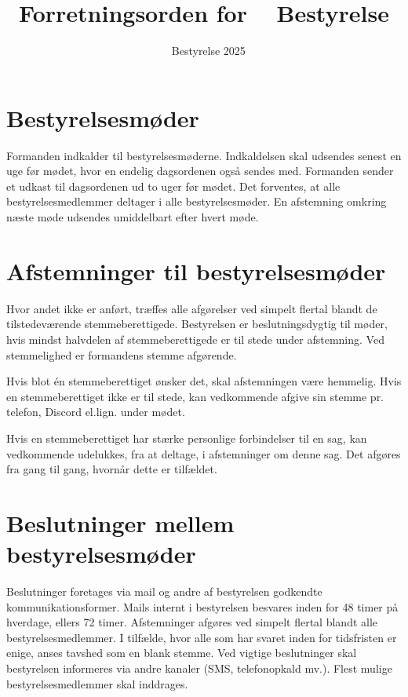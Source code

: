 

\title{Forretningsorden for \fredagscafeen~ Bestyrelse}
\author{\fredagscafeen~ Bestyrelse 2025}
\date{}

\renewcommand{\thesection}{§\arabic{section}}



\maketitle

\section{Bestyrelsesmøder}
Formanden indkalder til bestyrelsesmøderne. Indkaldelsen skal udsendes senest en uge før mødet, 
hvor en endelig dagsordenen også sendes med. Formanden sender et udkast til dagsordenen ud to 
uger før mødet. Det forventes, at alle bestyrelsesmedlemmer deltager i alle bestyrelsesmøder. 
En afstemning omkring næste møde udsendes umiddelbart efter hvert møde.

\section{Afstemninger til bestyrelsesmøder}
Hvor andet ikke er anført, træffes alle afgørelser ved simpelt flertal blandt de tilstedeværende 
stemmeberettigede. Bestyrelsen er beslutningsdygtig til møder, hvis mindst halvdelen af 
stemmeberettigede er til stede under afstemning. Ved stemmelighed er formandens stemme afgørende.

Hvis blot én stemmeberettiget ønsker det, skal afstemningen være hemmelig. Hvis en stemmeberettiget 
ikke er til stede, kan vedkommende afgive sin stemme pr. telefon, Discord el.lign. under mødet.

Hvis en stemmeberettiget har stærke personlige forbindelser til en sag, kan vedkommende udelukkes, 
fra at deltage, i afstemninger om denne sag. Det afgøres fra gang til gang, hvornår dette er tilfældet.

\section{Beslutninger mellem bestyrelsesmøder}
Beslutninger foretages via mail og andre af bestyrelsen godkendte kommunikationsformer. Mails internt 
i bestyrelsen besvares inden for 48 timer på hverdage, ellers 72 timer. Afstemninger afgøres ved simpelt 
flertal blandt alle bestyrelsesmedlemmer. I tilfælde, hvor alle som har svaret inden for tidsfristen er 
enige, anses tavshed som en blank stemme. Ved vigtige beslutninger skal bestyrelsen informeres via andre 
kanaler (SMS, telefonopkald mv.). Flest mulige bestyrelsesmedlemmer skal inddrages.


